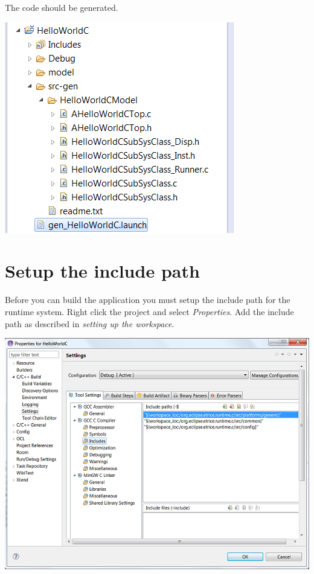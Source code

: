The code should be generated.

\includegraphics{images/034-HelloWorldC13.png}

\section{Setup the include path}

Before you can build the application you must setup the include path for the runtime system. Right click the project and select \textit{Properties}. Add the include path as described in \textit{setting up the workspace}.

\includegraphics{images/034-HelloWorldC14.png}


